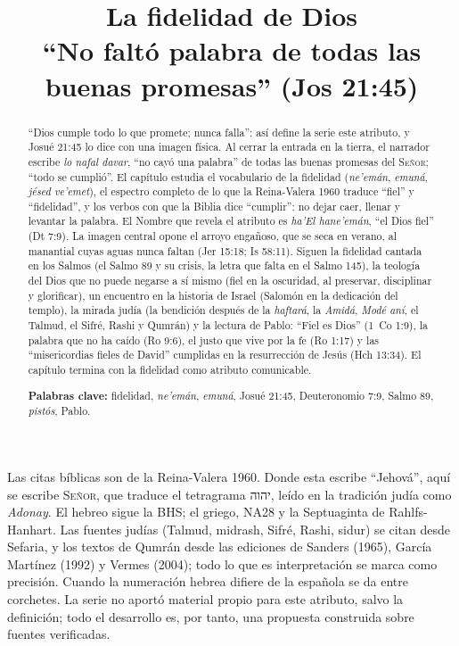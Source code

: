 \documentclass[11pt,letterpaper]{article}
\title{\color{azul}\bfseries La fidelidad de Dios\\[4pt]\large\color{gris}\mdseries ``No faltó palabra de todas las buenas promesas'' (Jos 21:45)}
\author{}\date{}
\newcommand{\heb}[1]{\mbox{\foreignlanguage{hebrew}{#1}}}
\newcommand{\SENOR}{\textsc{Señor}}
\begin{document}
\maketitle\thispagestyle{empty}

\begin{abstract}\noindent
``Dios cumple todo lo que promete; nunca falla'': así define la serie este atributo, y Josué 21:45 lo dice con una imagen física. Al cerrar la entrada en la tierra, el narrador escribe \emph{lo nafal davar}, ``no cayó una palabra'' de todas las buenas promesas del \SENOR; ``todo se cumplió''. El capítulo estudia el vocabulario de la fidelidad (\emph{ne'emán}, \emph{emuná}, \emph{jésed ve'emet}), el espectro completo de lo que la Reina-Valera 1960 traduce ``fiel'' y ``fidelidad'', y los verbos con que la Biblia dice ``cumplir'': no dejar caer, llenar y levantar la palabra. El Nombre que revela el atributo es \emph{ha'El hane'emán}, ``el Dios fiel'' (Dt 7:9). La imagen central opone el arroyo engañoso, que se seca en verano, al manantial cuyas aguas nunca faltan (Jer 15:18; Is 58:11). Siguen la fidelidad cantada en los Salmos (el Salmo 89 y su crisis, la letra que falta en el Salmo 145), la teología del Dios que no puede negarse a sí mismo (fiel en la oscuridad, al preservar, disciplinar y glorificar), un encuentro en la historia de Israel (Salomón en la dedicación del templo), la mirada judía (la bendición después de la \emph{haftará}, la \emph{Amidá}, \emph{Modé aní}, el Talmud, el Sifré, Rashi y Qumrán) y la lectura de Pablo: ``Fiel es Dios'' (1~Co 1:9), la palabra que no ha caído (Ro 9:6), el justo que vive por la fe (Ro 1:17) y las ``misericordias fieles de David'' cumplidas en la resurrección de Jesús (Hch 13:34). El capítulo termina con la fidelidad como atributo comunicable.
\par\smallskip\noindent\textbf{Palabras clave:} fidelidad, \emph{ne'emán}, \emph{emuná}, Josué 21:45, Deuteronomio 7:9, Salmo 89, \emph{pistós}, Pablo.\end{abstract}

\begin{nota}
Las citas bíblicas son de la Reina-Valera 1960. Donde esta escribe ``Jehová'', aquí se escribe \SENOR, que traduce el tetragrama \heb{יהוה}, leído en la tradición judía como \emph{Adonay}. El hebreo sigue la BHS; el griego, NA28 y la Septuaginta de Rahlfs-Hanhart. Las fuentes judías (Talmud, midrash, Sifré, Rashi, sidur) se citan desde Sefaria, y los textos de Qumrán desde las ediciones de Sanders (1965), García Martínez (1992) y Vermes (2004); todo lo que es interpretación se marca como precisión. Cuando la numeración hebrea difiere de la española se da entre corchetes. La serie no aportó material propio para este atributo, salvo la definición; todo el desarrollo es, por tanto, una propuesta construida sobre fuentes verificadas.
\end{nota}
\end{document}

